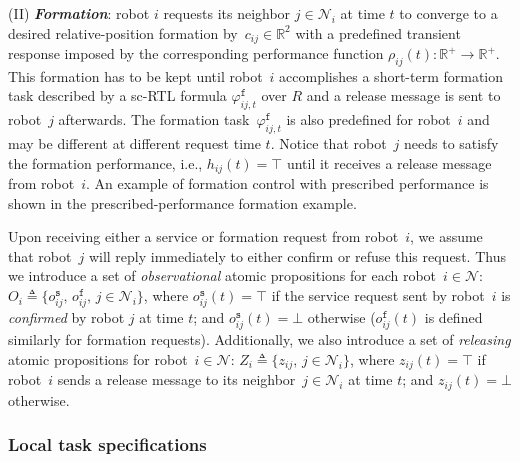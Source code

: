 (II) \textbf{\emph{Formation}}: robot $i$ requests its neighbor $j\in \mathcal{N}_i$ at time $t$ to converge to a desired relative-position formation  by~$c_{ij}\in \mathbb{R}^2$ with a predefined transient response imposed by the corresponding performance function $\rho_{ij}(t):\mathbb{R}^+\rightarrow \mathbb{R}^+$. This formation has to be kept until robot~$i$ accomplishes a short-term formation task described by a sc-RTL formula $\varphi_{ij,t}^\texttt{f}$ over $R$ and a release message is sent to robot~$j$ afterwards.
The formation task~$\varphi_{ij,t}^\texttt{f}$ is also predefined for robot~$i$ and may be different at different request time $t$.
Notice that robot~$j$ needs to satisfy the formation performance, i.e., $h_{ij}(t)=\top$ until it receives a release message from robot~$i$.
An example of formation control with prescribed performance is shown in the prescribed-performance formation example.

Upon receiving either a service or formation request from robot~$i$, we assume that robot~$j$ will reply immediately to either confirm or refuse this request.
Thus we introduce a set of \emph{observational} atomic propositions for each robot~$i\in \mathcal{N}$: $O_i\triangleq\{o_{ij}^\texttt{s},\, o_{ij}^\texttt{f},\, j\in \mathcal{N}_i\}$, where $o_{ij}^\texttt{s}(t)=\top$ if the  service request sent by robot~$i$ is \emph{confirmed} by robot $j$ at time $t$; and $o_{ij}^\texttt{s}(t)=\bot$ otherwise ($o_{ij}^\texttt{f}(t)$ is defined similarly for formation requests).
Additionally, we also introduce a set of \emph{releasing} atomic propositions for robot~$i\in \mathcal{N}$:  $Z_i\triangleq\{z_{ij},\, j\in \mathcal{N}_i\}$, where $z_{ij}(t)=\top$ if robot~$i$ sends a release message to its neighbor~$j\in \mathcal{N}_i$ at time $t$; and $z_{ij}(t)=\bot$ otherwise.

\subsubsection{Local task specifications}\label{ch03:sec:local_task}

